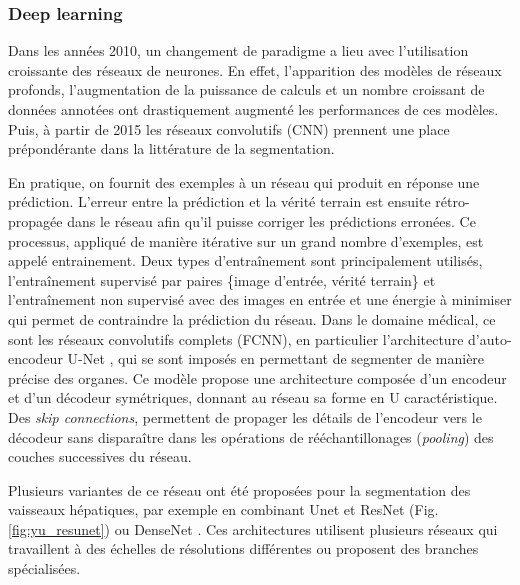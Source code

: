       \subsubsection{Deep learning}

      Dans les années 2010, un changement de paradigme a lieu avec l'utilisation croissante des réseaux de neurones. En effet, l'apparition des modèles de réseaux profonds, l'augmentation de la puissance de calculs et un nombre croissant de données annotées ont drastiquement augmenté les performances de ces modèles. Puis, à partir de 2015 les réseaux convolutifs (CNN) prennent une place prépondérante dans la littérature de la segmentation. 
      
      En pratique, on fournit des exemples à un réseau qui produit en réponse une prédiction. L'erreur entre la prédiction et la vérité terrain est ensuite rétro-propagée dans le réseau afin qu'il puisse corriger les prédictions erronées. Ce processus, appliqué de manière itérative sur un grand nombre d'exemples, est appelé entrainement. Deux types d'entraînement sont principalement utilisés, l'entraînement supervisé par paires \{image d'entrée, vérité terrain\} et l'entraînement non supervisé avec des images en entrée et une énergie à minimiser qui permet de contraindre la prédiction du réseau.
      Dans le domaine médical, ce sont les réseaux convolutifs complets (FCNN), en particulier l'architecture d'auto-encodeur U-Net \cite{Ronneberger2015_Unet}, qui se sont imposés en permettant de segmenter de manière précise des organes. Ce modèle propose une architecture composée d'un encodeur et d'un décodeur symétriques, donnant au réseau sa forme en U caractéristique. Des \textit{skip connections}, permettent de propager les détails de l'encodeur vers le décodeur sans disparaître dans les opérations de rééchantillonages (\textit{pooling}) des couches successives du réseau.

      Plusieurs variantes de ce réseau ont été proposées pour la segmentation des vaisseaux hépatiques, par exemple en combinant Unet et ResNet \cite{yu2019_liver_ResUnet}(Fig. \ref{fig:yu_resunet}) ou DenseNet \cite{Li2018_DenseUnet}. Ces architectures utilisent plusieurs réseaux qui travaillent à des échelles de résolutions différentes ou proposent des branches spécialisées.
      
